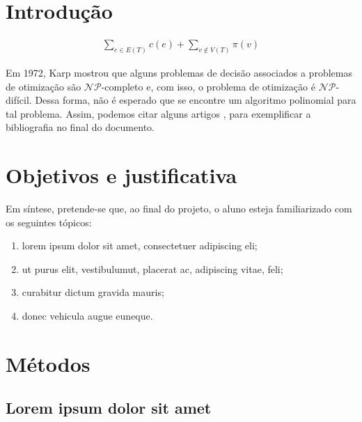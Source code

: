 \documentclass[12pt]{projeto}
\begin{document}
\begin{resumo}
    \lipsum[1]
\end{resumo}

\section{Introdução}

\begin{align*}
    \sum_{e \in E(T)} c(e) + \sum_{v \notin V(T)} \pi(v)
\end{align*}

\lipsum[3 - 4]

Em 1972, Karp \cite{Karp72} mostrou que alguns problemas de decisão associados a problemas de otimização são $\mathcal{NP}$-completo e, com isso, o problema de otimização é $\mathcal{NP}$-difícil. Dessa forma, não é esperado que se encontre um algoritmo polinomial para tal problema. Assim, podemos citar alguns artigos \cite{BolukbasiK18, dimacs11, LjubicWPKMF05}, para exemplificar a bibliografia no final do documento.

\section{Objetivos e justificativa}

\lipsum[1]

Em síntese, pretende-se que, ao final do projeto, o aluno esteja familiarizado com os seguintes tópicos:

\begin{enumerate}[label=\roman*)]
    \item lorem ipsum dolor sit amet, consectetuer adipiscing eli;
    \item ut purus elit, vestibulumut, placerat ac, adipiscing vitae, feli;
    \item curabitur dictum gravida mauris;
    \item donec vehicula augue euneque.
\end{enumerate}

\section{Métodos}

\lipsum[2]

\subsection{Lorem ipsum dolor sit amet}
\end{document}
